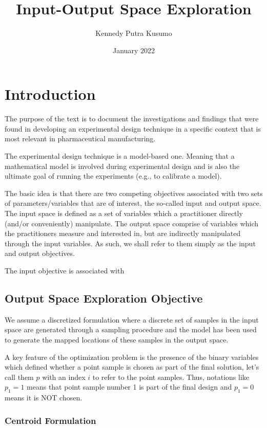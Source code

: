 \documentclass{article}
\title{Input-Output Space Exploration}
\author{Kennedy Putra Kusumo}
\date{January 2022}
\begin{document}
	
	\maketitle
	
	\section{Introduction}
	The purpose of the text is to document the investigations and findings that were found in developing an experimental design technique in a specific context that is most relevant in pharmaceutical manufacturing.
	
	The experimental design technique is a model-based one. Meaning that a mathematical model is involved during experimental design and is also the ultimate goal of running the experiments (e.g., to calibrate a model).
	
	The basic idea is that there are two competing objectives associated with two sets of parameters/variables that are of interest, the so-called input and output space. The input space is defined as a set of variables which a practitioner directly (and/or conveniently) manipulate. The output space comprise of variables which the practitioners measure and interested in, but are indirectly manipulated through the input variables. As such, we shall refer to them simply as the input and output objectives.
	
	The input objective is associated with 
	
	\subsection{Output Space Exploration Objective}
	We assume a discretized formulation where a discrete set of samples in the input space are generated through a sampling procedure and the model has been used to generate the mapped locations of these samples in the output space.
	
	A key feature of the optimization problem is the presence of the binary variables which defined whether a point sample is chosen as part of the final solution, let's call them $p$ with an index $i$ to refer to the point samples. Thus, notations like $p_1 = 1$ means that point sample number 1 is part of the final design and $p_1 = 0$ means it is NOT chosen. 
	
	\subsubsection{Centroid Formulation}
	
\end{document}
